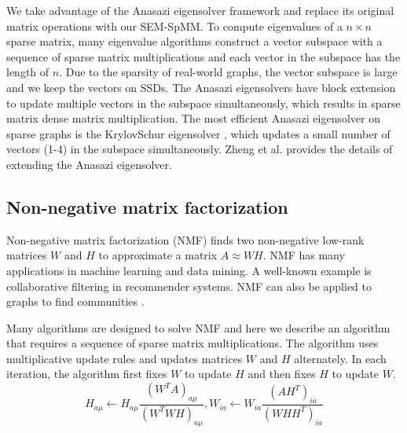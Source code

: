 We take advantage of the Anasazi eigensolver framework \cite{anasazi} and
replace its original matrix operations with our SEM-SpMM. To compute eigenvalues
of a $n \times n$ sparse matrix, many eigenvalue algorithms construct a vector
subspace with a sequence of sparse matrix multiplications and each vector in
the subspace has the length of $n$. Due to the sparsity of real-world graphs,
the vector subspace is large and we keep the vectors on SSDs.
The Anasazi eigensolvers have block extension to update multiple vectors in
the subspace simultaneously, which results in sparse matrix dense
matrix multiplication. The most efficient Anasazi eigensolver on sparse graphs
is the KrylovSchur eigensolver \cite{krylovschur}, which updates a small number
of vectors (1-4) in the subspace simultaneously. Zheng et al.
\cite{flasheigen} provides the details of extending the Anasazi eigensolver.


\subsection{Non-negative matrix factorization}
Non-negative matrix factorization (NMF) \cite{nmf} finds two non-negative
low-rank matrices $W$ and $H$ to approximate a matrix $A \approx WH$. NMF
has many applications in machine learning
and data mining. A well-known example is collaborative filtering \cite{cf} in
recommender systems. NMF can also be applied to graphs to find communities
\cite{yang13, wang11}.

Many algorithms are designed to solve NMF and here we describe an algorithm
\cite{nmf} that requires a sequence of sparse matrix multiplications.
The algorithm uses multiplicative update rules and updates matrices $W$ and $H$
alternately. In each iteration, the algorithm first fixes $W$ to update $H$
and then fixes $H$ to update $W$.
\begin{equation*}
H_{a\mu} \leftarrow H_{a\mu} \frac{{(W^TA)}_{a\mu}}{{(W^TWH)}_{a\mu}},
W_{ia} \leftarrow W_{ia} \frac{{(AH^T)}_{ia}}{{(WHH^T)}_{ia}}
\end{equation*}

